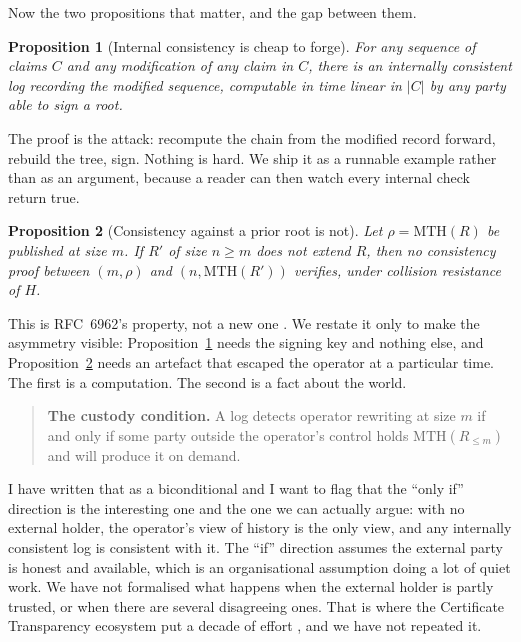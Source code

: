 \documentclass[11pt]{article}
\newtheorem{proposition}{Proposition}
\begin{document}
Now the two propositions that matter, and the gap between them.

\begin{proposition}[Internal consistency is cheap to forge]
\label{prop:cheap}
For any sequence of claims $C$ and any modification of any claim in $C$, there
is an internally consistent log recording the modified sequence, computable in
time linear in $|C|$ by any party able to sign a root.
\end{proposition}

The proof is the attack: recompute the chain from the modified record forward,
rebuild the tree, sign. Nothing is hard. We ship it as a runnable example
rather than as an argument, because a reader can then watch every internal
check return true.

\begin{proposition}[Consistency against a prior root is not]
\label{prop:prior}
Let $\rho = \mathrm{MTH}(R)$ be published at size $m$. If $R'$ of size
$n \ge m$ does not extend $R$, then no consistency proof between
$(m, \rho)$ and $(n, \mathrm{MTH}(R'))$ verifies, under collision resistance
of $H$.
\end{proposition}

This is RFC~6962's property, not a new one \cite{rfc6962}. We restate it only
to make the asymmetry visible: Proposition~\ref{prop:cheap} needs the signing
key and nothing else, and Proposition~\ref{prop:prior} needs an artefact that
escaped the operator at a particular time. The first is a computation. The
second is a fact about the world.

\begin{quote}
\textbf{The custody condition.} A log detects operator rewriting at size $m$
if and only if some party outside the operator's control holds
$\mathrm{MTH}(R_{\le m})$ and will produce it on demand.
\end{quote}

I have written that as a biconditional and I want to flag that the ``only if''
direction is the interesting one and the one we can actually argue: with no
external holder, the operator's view of history is the only view, and any
internally consistent log is consistent with it. The ``if'' direction assumes
the external party is honest and available, which is an organisational
assumption doing a lot of quiet work. We have not formalised what happens when
the external holder is partly trusted, or when there are several disagreeing
ones. That is where the Certificate Transparency ecosystem put a decade of
effort \cite{rfc9162}, and we have not repeated it.
\end{document}

